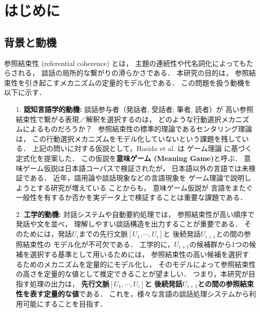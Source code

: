 \documentclass[japanese]{jnlp_1.3e}
\begin{document}
\maketitle



\section{はじめに}
\label{sec:intro}

\subsection{背景と動機}

参照結束性 (referential coherence) とは，
主題の連続性や代名詞化によってもたらされる，
談話の局所的な繋がりの滑らかさである．
本研究の目的は，
参照結束性を引き起こすメカニズムの定量的モデル化である．
この問題を扱う動機を以下に示す．
\begin{itemize}
\item[1.] {\bf 認知言語学的動機: } 談話参与者（発話者, 受話者; 筆者, 読者）が
高い参照結束性で繋がる表現／解釈を選択するのは，
どのような行動選択メカニズムによるものだろうか？~
参照結束性の標準的理論であるセンタリング理論は，
この行動選択メカニズムをモデル化していないという課題を残している．
上記の問いに対する仮説として，Hasida et al. \citeyear{hasida1995} は
ゲーム理論 に基づく定式化を提案した．
この仮説を{\bf 意味ゲーム (Meaning Game)}と呼ぶ．
意味ゲーム仮説は日本語コーパスで検証されたが，
日本語以外の言語では未検証である．
近年，語用論や談話現象などの言語現象を
ゲーム理論で説明しようとする研究が増えている  ことからも，
意味ゲーム仮説が
言語をまたぐ一般性を有するか否かを実データ上で検証することは重要な課題である．
\item[2.] {\bf 工学的動機: } 対話システムや自動要約処理では，
参照結束性が高い順序で発話や文を並べ，
理解しやすい談話構造を出力することが重要である．
そのためには，発話$U_i$までの先行文脈$[U_1,\cdots,U_i]$と
後続発話$U_{i+1}$との間の参照結束性の
モデル化が不可欠である．
工学的に，$U_{i+1}$の候補群から1つの候補を選択する基準として用いるためには，
参照結束性の高い候補を選択するためのメカニズムを定量的にモデル化し，
そのモデルによって参照結束性の高さを定量的な値として推定できることが望ましい．
つまり，本研究が目指す処理の出力は，
{\bf 先行文脈$[U_1,\cdots,U_i]$と
後続発話$U_{i+1}$との間の参照結束性を表す定量的な値}である．
これを，様々な言語の談話処理システムから利用可能にすることを目指す．
\end{itemize}
\end{document}
